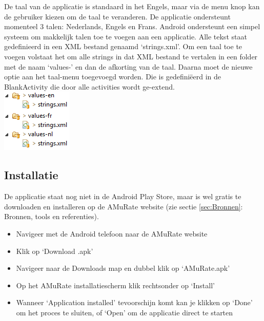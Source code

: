 \documentclass[11pt,a4paper]{article}
\begin{document}
	De taal van de applicatie is standaard in het Engels, maar via de menu knop kan de gebruiker kiezen om de taal te veranderen. De applicatie ondersteunt momenteel 3 talen: Nederlands, Engels en Frans. Android ondersteunt een simpel systeem om makkelijk talen toe te voegen aan een applicatie. Alle tekst staat gedefinieerd in een XML bestand genaamd `strings.xml'. Om een taal toe te voegen volstaat het om alle strings in dat XML bestand te vertalen in een folder met de naam `values-' en dan de afkorting van de taal. Daarna moet de nieuwe optie aan het taal-menu toegevoegd worden. Die is gedefiniëerd in de BlankActivity die door alle activities wordt ge-extend. \\
	\includegraphics[scale=1]{Pictures/lang_folder.png}
	
	\subsection{Installatie}
	\label{sec:Installatie}
	De applicatie staat nog niet in de Android Play Store, maar is wel gratis te downloaden en installeren op de AMuRate website (zie sectie \ref{sec:Bronnen}: Bronnen, tools en referenties). 
	\begin{itemize}
		\item Navigeer met de Android telefoon naar de AMuRate website 
		\item Klik op `Download .apk'
		\item Navigeer naar de Downloads map en dubbel klik op `AMuRate.apk'
		\item Op het AMuRate installatiescherm klik rechtsonder op `Install'
		\item Wanneer `Application installed' tevoorschijn komt kan je klikken op `Done' om het proces te sluiten, of `Open' om de applicatie direct te starten
	\end{itemize}
	
	
	
	\newpage
\end{document}
